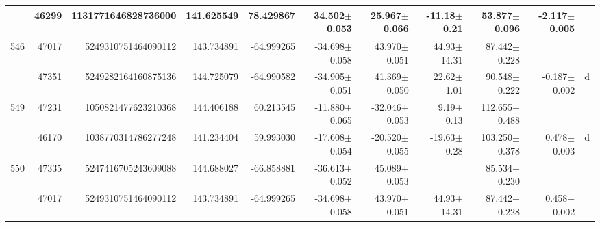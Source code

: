 \documentclass{ws-ijmpd}
\begin{document}
\begin{landscape}
\begin{longtable}{rrrrrrrrrrl}
            &   46299 &      1131771646828736000 &                   141.625549 &                    78.429867 &                 34.502$\pm$0.053 &                 25.967$\pm$0.066 &         -11.18$\pm$  0.21 &        53.877$\pm$0.096 &                          -2.117$\pm$0.005 &                                                    \\
 \hline 546 &   47017 &      5249310751464090112 &                   143.734891 &                   -64.999265 &                -34.698$\pm$0.058 &                 43.970$\pm$0.051 &          44.93$\pm$ 14.31 &        87.442$\pm$0.228 &                                           &                                                    \\
            &   47351 &      5249282164160875136 &                   144.725079 &                   -64.990582 &                -34.905$\pm$0.051 &                 41.369$\pm$0.050 &          22.62$\pm$  1.01 &        90.548$\pm$0.222 &                          -0.187$\pm$0.002 &                                                  d \\
 \hline 549 &   47231 &      1050821477623210368 &                   144.406188 &                    60.213545 &                -11.880$\pm$0.065 &                -32.046$\pm$0.053 &           9.19$\pm$  0.13 &       112.655$\pm$0.488 &                                           &                                                    \\
            &   46170 &      1038770314786277248 &                   141.234404 &                    59.993030 &                -17.608$\pm$0.054 &                -20.520$\pm$0.055 &         -19.63$\pm$  0.28 &       103.250$\pm$0.378 &                           0.478$\pm$0.003 &                                                  d \\
 \hline 550 &   47335 &      5247416705243609088 &                   144.688027 &                   -66.858881 &                -36.613$\pm$0.052 &                 45.089$\pm$0.053 &                           &        85.534$\pm$0.230 &                                           &                                                    \\
            &   47017 &      5249310751464090112 &                   143.734891 &                   -64.999265 &                -34.698$\pm$0.058 &                 43.970$\pm$0.051 &          44.93$\pm$ 14.31 &        87.442$\pm$0.228 &                           0.458$\pm$0.002 &                                                    \\

\end{longtable}
\end{landscape}
\end{document}
